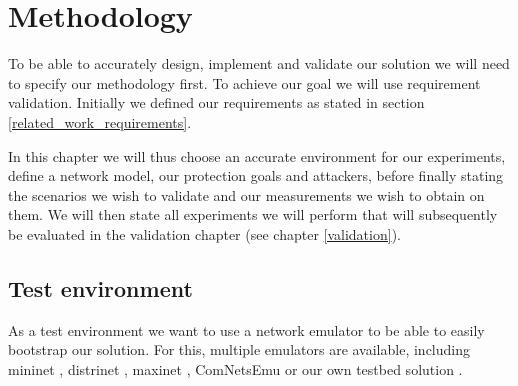 \chapter{Methodology}
\label{methodology}
\iffalse
\begin{itemize}
    \item Requirement validation as base methodology
    \item Test environment (Discussion Mininet vs Distrinet vs our solution)
    \item Protection goals (including metrics like bandwidth and latency)
    \begin{itemize}
        \item Questions that can be validated in chapter “Validation” => Protection goal list
    \end{itemize}
    \item Attackers
    \item Deployments
    \begin{itemize}
        \item Full local deployment
        \item Minimal distributed deployment (2 Hosts, 1 real-world SDN Switch)
    \end{itemize}
\end{itemize}
\fi
To be able to accurately design, implement and validate our solution we will need to specify our methodology first. To achieve our goal we will use requirement validation. Initially we defined our requirements as stated in section \ref{related_work_requirements}.

In this chapter we will thus choose an accurate environment for our experiments, define a network model, our protection goals and attackers, before finally stating the scenarios we wish to validate and our measurements we wish to obtain on them. We will then state all experiments we will perform that will subsequently be evaluated in the validation chapter (see chapter \ref{validation}).

\section{Test environment}
As a test environment we want to use a network emulator to be able to easily bootstrap our solution. For this, multiple emulators are available, including mininet \cite{mininet}, distrinet \cite{distrinet1, distrinet2}, maxinet \cite{maxinet}, ComNetsEmu \cite{comnetsemu} or our own testbed solution \cite{owntb}.

